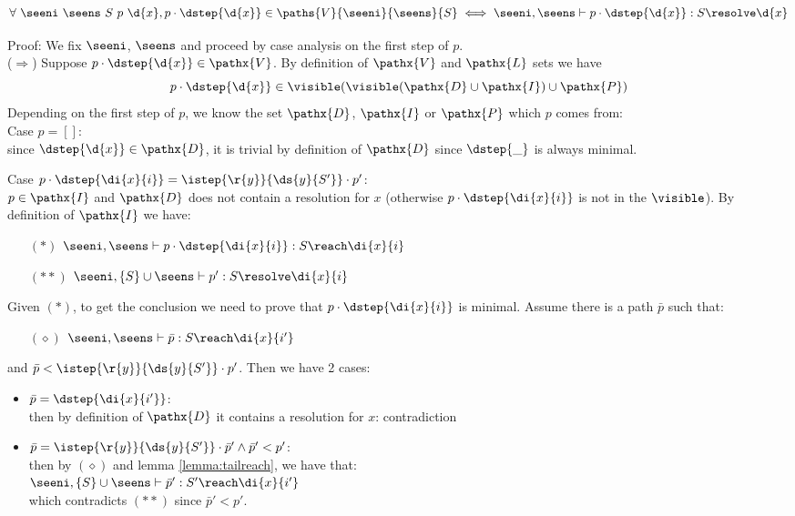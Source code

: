\begin{lemma}
  \begin{multline*}
\forall\ \seeni\ \seens\ S\ p\ \d{x}, p \cdot \dstep{\d{x}}\in\paths{V}{\seeni}{\seens}{S} \iff \seeni,\seens \vdash p \cdot \dstep{\d{x}}: S \resolve \d{x}    
  \end{multline*}
\end{lemma}

Proof: We fix $\seeni$, $\seens$ and proceed by case analysis on the first step of $p$.\medskip\\
($\Rightarrow$) Suppose $p \cdot \dstep{\d{x}}\in\pathx{V}$. By definition of $\pathx{V}$ and $\pathx{L}$
sets we have 
\begin{equation*}
  p \cdot \dstep{\d{x}}\in \visible(\visible(\pathx{D} \cup \pathx{I}) \cup \pathx{P}) 
\end{equation*}
Depending on the first step of $p$, we know the set $\pathx{D}$, $\pathx{I}$ or $\pathx{P}$ which $p$ comes from:\medskip\\

\noindent Case $p = []$:\\
since $\dstep{\d{x}}\in \pathx{D}$, it is trivial by definition of $\pathx{D}$ since $\dstep{\_}$ is always minimal.\medskip

\noindent Case $p \cdot \dstep{\di{x}{i}} = \istep{\r{y}}{\ds{y}{S'}}\cdot p'$: \\
$p \in \pathx{I}$ and $\pathx{D}$ does not contain a resolution for $x$ (otherwise $p\cdot \dstep{\di{x}{i}}$ is not in the $\visible$).
By definition of $\pathx{I}$ we have:
\begin{itemize}[leftmargin=15mm]
 \item[$(*)$]  $\seeni,\seens \vdash p\cdot \dstep{\di{x}{i}} : S \reach \di{x}{i}  $
 \item[$(**)$]  $\seeni,\{S\}\cup\seens \vdash p' : S \resolve \di{x}{i}  $
\end{itemize}
Given $(*)$, to get the conclusion we need to prove that $p\cdot \dstep{\di{x}{i}}$ is minimal. Assume there is a path $\bar{p}$ such that:
\begin{itemize}[leftmargin=15mm]
 \item[$ (\diamond)$] $ \seeni,\seens \vdash \bar{p} : S \reach \di{x}{i'}$
\end{itemize}
and $\bar{p} < \istep{\r{y}}{\ds{y}{S'}}\cdot p'$. Then we have 2 cases:
\begin{itemize}[leftmargin=10mm]
 \item $\bar{p} = \dstep{\di{x}{i'}}$:\\
  then by definition of $\pathx{D}$ it contains a resolution for $x$: contradiction
 \item $\bar{p} = \istep{\r{y}}{\ds{y}{S'}}\cdot \bar{p}' \wedge \bar{p}' < p'$:\\
  then by $(\diamond)$ and lemma \ref{lemma:tailreach}, we have that:\\
  \tab $\seeni,\{S\} \cup \seens \vdash \bar{p}' : S' \reach \di{x}{i'}$ \\
  which contradicts $(**)$ since $\bar{p}' < p'$.\medskip
\end{itemize}

